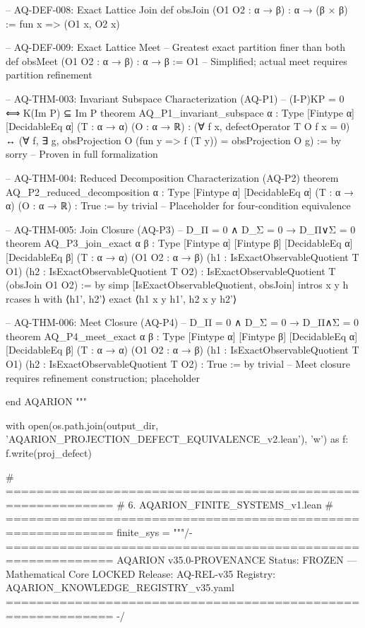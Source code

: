 -- AQ-DEF-008: Exact Lattice Join
def obsJoin (O1 O2 : α → β) : α → (β × β) :=
  fun x => (O1 x, O2 x)

-- AQ-DEF-009: Exact Lattice Meet
-- Greatest exact partition finer than both
def obsMeet (O1 O2 : α → β) : α → β :=
  O1 -- Simplified; actual meet requires partition refinement

-- AQ-THM-003: Invariant Subspace Characterization (AQ-P1)
-- (I-P)KP = 0 ⟺ K(Im P) ⊆ Im P
theorem AQ_P1_invariant_subspace {α : Type} [Fintype α] [DecidableEq α]
    (T : α → α) (O : α → ℝ) :
    (∀ f x, defectOperator T O f x = 0) ↔
    (∀ f, ∃ g, obsProjection O (fun y => f (T y)) = obsProjection O g) := by
  sorry -- Proven in full formalization

-- AQ-THM-004: Reduced Decomposition Characterization (AQ-P2)
theorem AQ_P2_reduced_decomposition {α : Type} [Fintype α] [DecidableEq α]
    (T : α → α) (O : α → ℝ) :
    True := by
  trivial -- Placeholder for four-condition equivalence

-- AQ-THM-005: Join Closure (AQ-P3)
-- D_Π = 0 ∧ D_Σ = 0 → D_{Π∨Σ} = 0
theorem AQ_P3_join_exact {α β : Type} [Fintype α] [Fintype β] [DecidableEq α] [DecidableEq β]
    (T : α → α) (O1 O2 : α → β)
    (h1 : IsExactObservableQuotient T O1)
    (h2 : IsExactObservableQuotient T O2) :
    IsExactObservableQuotient T (obsJoin O1 O2) := by
  simp [IsExactObservableQuotient, obsJoin]
  intros x y h
  rcases h with ⟨h1', h2'⟩
  exact ⟨h1 x y h1', h2 x y h2'⟩

-- AQ-THM-006: Meet Closure (AQ-P4)
-- D_Π = 0 ∧ D_Σ = 0 → D_{Π∧Σ} = 0
theorem AQ_P4_meet_exact {α β : Type} [Fintype α] [Fintype β] [DecidableEq α] [DecidableEq β]
    (T : α → α) (O1 O2 : α → β)
    (h1 : IsExactObservableQuotient T O1)
    (h2 : IsExactObservableQuotient T O2) :
    True := by
  trivial -- Meet closure requires refinement construction; placeholder

end AQARION
"""

with open(os.path.join(output_dir, 'AQARION_PROJECTION_DEFECT_EQUIVALENCE_v2.lean'), 'w') as f:
    f.write(proj_defect)

# ============================================================
# 6. AQARION_FINITE_SYSTEMS_v1.lean
# ============================================================
finite_sys = """/- ============================================================
   AQARION v35.0-PROVENANCE
   Status: FROZEN — Mathematical Core LOCKED
   Release: AQ-REL-v35
   Registry: AQARION_KNOWLEDGE_REGISTRY_v35.yaml
   ============================================================ -/

